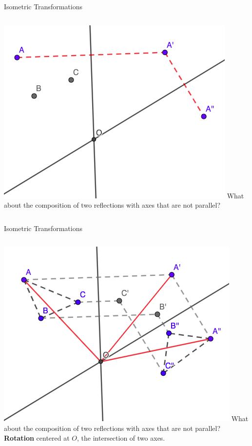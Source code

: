 \documentclass{beamer}
\begin{document}
\begin{frame}{Isometric Transformations}
	\begin{columns}
		\includegraphics[scale=0.4]{iso12.png}
		What about the composition of two reflections with
		axes that are not parallel?
	\end{columns}
\end{frame}
\begin{frame}{Isometric Transformations}
	\begin{columns}
		\column{0.6\textwidth}
		\includegraphics[scale=0.4]{iso13.png}
		\column{0.4\textwidth}
		What about the composition of two reflections with
		axes that are not parallel?\\
		\phantom{Spacing}
		\textbf{Rotation} centered at $O$, the intersection of
		two axes.
	\end{columns}
\end{frame}
\end{document}
